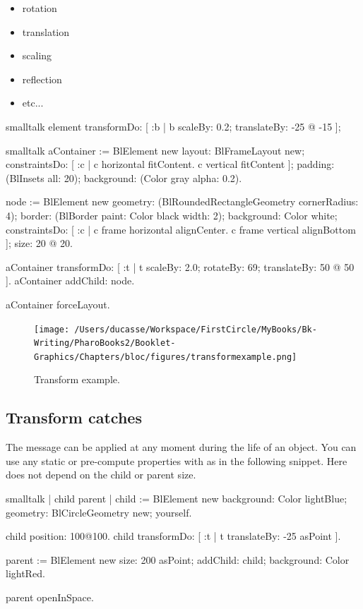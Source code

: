 \documentclass[10pt,twoside,english]{_support/latex/sbabook/sbabook}
\begin{document}
\begin{itemize}
    \item rotation
    \item translation
    \item scaling
    \item reflection
    \item etc...
\end{itemize}
\begin{displaycode}{smalltalk}
element transformDo: [ :b | b scaleBy: 0.2; translateBy: -25 @ -15 ];
\end{displaycode}
\begin{displaycode}{smalltalk}
aContainer := BlElement new
                    layout: BlFrameLayout new;
                    constraintsDo: [ :c |
                        c horizontal fitContent.
                        c vertical fitContent ];
                    padding: (BlInsets all: 20);
                    background: (Color gray alpha: 0.2).

node := BlElement new
            geometry: (BlRoundedRectangleGeometry cornerRadius: 4);
            border: (BlBorder paint: Color black width: 2);
            background: Color white;
            constraintsDo: [ :c |
                c frame horizontal alignCenter.
                c frame vertical alignBottom ];
            size: 20 @ 20.

aContainer transformDo: [ :t |
    t
        scaleBy: 2.0;
        rotateBy: 69;
        translateBy: 50 @ 50 ].
aContainer addChild: node.

aContainer forceLayout.
\end{displaycode}

\begin{figure}[htpb]
\begin{center}
\texttt{[image: /Users/ducasse/Workspace/FirstCircle/MyBooks/Bk-Writing/PharoBooks2/Booklet-Graphics/Chapters/bloc/figures/transformexample.png]}
\caption{Transform example.}
\end{center}
\end{figure}


\subsection{Transform catches}
The message  can be applied at any moment during the life of an object.
You can use any static or pre-compute properties with  as in the following snippet.
Here  does not depend on the child or parent size.
\begin{displaycode}{smalltalk}
| child parent |
child := BlElement new 
background: Color lightBlue; 
geometry: BlCircleGeometry new;
yourself.
 
child position: 100@100.
child  transformDo: [ :t | t translateBy: -25 asPoint ].

parent := BlElement new 
size: 200 asPoint; 
addChild: child;
background: Color lightRed.

parent openInSpace.
\end{displaycode}
\end{document}
